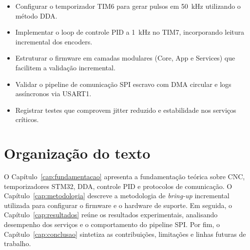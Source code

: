 \begin{itemize}
    \item Configurar o temporizador TIM6 para gerar pulsos em
          \SI{50}{\kilo\hertz} utilizando o método DDA.
    \item Implementar o loop de controle PID a \SI{1}{\kilo\hertz}
          no TIM7, incorporando leitura incremental dos encoders.
    \item Estruturar o firmware em camadas modulares (Core, App e
          Services) que facilitem a validação incremental.
    \item Validar o pipeline de comunicação SPI escravo com DMA circular
          e logs assíncronos via USART1.
    \item Registrar testes que comprovem jitter reduzido e estabilidade
          nos serviços críticos.
\end{itemize}

\section{Organização do texto}\label{sec:organizacao}

O Capítulo~\ref{cap:fundamentacao} apresenta a fundamentação teórica
sobre CNC, temporizadores STM32, DDA, controle PID e protocolos de
comunicação. O Capítulo~\ref{cap:metodologia} descreve a metodologia de
\emph{bring-up} incremental utilizada para configurar o firmware e o
hardware de suporte. Em seguida, o Capítulo~\ref{cap:resultados}
reúne os resultados experimentais, analisando desempenho dos serviços e
o comportamento do pipeline SPI. Por fim, o
Capítulo~\ref{cap:conclusao} sintetiza as contribuições, limitações e
linhas futuras de trabalho.
